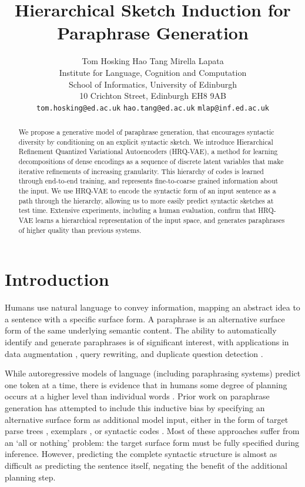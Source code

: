 \documentclass[11pt]{article}
\title{Hierarchical Sketch Induction for Paraphrase Generation}
\author{{Tom Hosking \qquad Hao Tang \qquad Mirella Lapata} \\
  Institute for Language, Cognition and Computation \\
  School of Informatics, University of Edinburgh \\
  10 Crichton Street, Edinburgh EH8 9AB\\
  \texttt{tom.hosking@ed.ac.uk} \quad \texttt{hao.tang@ed.ac.uk} \quad \texttt{mlap@inf.ed.ac.uk}}
\begin{document}
\maketitle
\begin{abstract}
We propose a generative model of paraphrase generation, that encourages syntactic diversity by conditioning on an explicit syntactic sketch. We introduce Hierarchical Refinement Quantized Variational Autoencoders (HRQ-VAE), a method for learning decompositions of dense encodings as a sequence of discrete latent variables that make iterative refinements of increasing granularity. This hierarchy of codes is learned through end-to-end training, and represents fine-to-coarse grained information about the input. We use HRQ-VAE to encode the syntactic form of an input sentence as a path through the hierarchy, allowing us to more easily predict syntactic sketches at test time. Extensive experiments, including a human evaluation, confirm that HRQ-VAE learns a hierarchical representation of the input space, and generates paraphrases of higher quality than previous systems.
\end{abstract}

\section{Introduction}





Humans use natural language to convey information, mapping an abstract idea to a sentence with a specific surface form. A paraphrase is an alternative surface form of the same underlying semantic content. The ability to automatically identify and generate paraphrases is of significant interest, with applications in data augmentation \cite{iyyer-etal-2018-adversarial}, query rewriting, \cite{dong-etal-2017-learning-paraphrase} and duplicate question detection \cite{shah-etal-2018-adversarial}.

 While autoregressive models of language (including paraphrasing systems) predict one token at a time, there is evidence that in humans some degree of planning occurs at a higher level than individual words \cite{levelt_planning,martin2010planning}. Prior work on paraphrase generation has attempted to include this inductive bias by specifying an alternative surface form as additional model input, either in the form of target parse trees \cite{iyyer-etal-2018-adversarial,chen-etal-2019-controllable,sgcp2020}, exemplars \cite{meng2021conrpg}, or syntactic codes \cite{shu-etal-2019-generating, hosking-lapata-2021-factorising}. Most of these approaches suffer from an `all or nothing' problem: the target surface form must be fully specified during inference. However, predicting the complete syntactic structure is almost as difficult as predicting the sentence itself, negating the benefit of the additional planning step.
 
\end{document}
